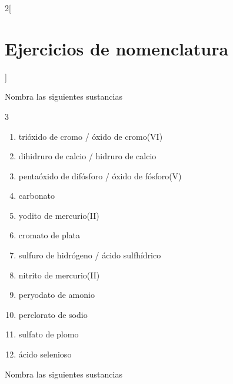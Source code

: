 \documentclass[10pt]{article}
\begin{document}
\begin{multicols*}{2}[
  \section{Ejercicios de nomenclatura}
  ]
\begin{exercise}[
    tags    = {inorgánica,nomenclatura,múltiple,2B},
    topics  = {química inorgánica,formulación,nomenclatura},
    source  = {Química 2B SAN 2016, p372, e10},
  ]
  Nombra las siguientes sustancias

  \begin{enumerate}\begin{multicols}{3}
    \item {}
    \item {}
    \item {}
    \item {}
    \item {}
    \item {}
    \item {}
    \item {}
    \item {}
    \item {}
    \item {}
    \item {}
  \end{multicols}\end{enumerate}
\end{exercise}

\begin{solution}
  \begin{enumerate}
    \item trióxido de cromo / óxido de cromo(VI)
    \item dihidruro de calcio / hidruro de calcio
    \item pentaóxido de difósforo / óxido de fósforo(V)
    \item carbonato
    \item yodito de mercurio(II)
    \item cromato de plata
    \item sulfuro de hidrógeno / ácido sulfhídrico
    \item nitrito de mercurio(II)
    \item peryodato de amonio
    \item perclorato de sodio
    \item sulfato de plomo
    \item ácido selenioso
  \end{enumerate}
\end{solution}




\begin{exercise}[
    tags    = {inorgánica,nomenclatura,múltiple,2B},
    topics  = {química inorgánica,formulación,nomenclatura},
    source  = {Química 2B SAN 2016, p372, e11},
  ]
  Nombra las siguientes sustancias


\end{exercise}
\end{multicols*}
\end{document}
